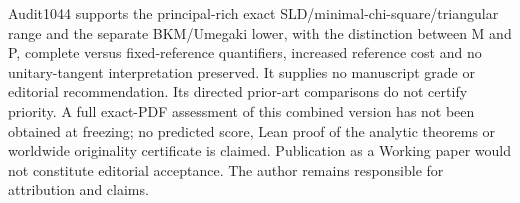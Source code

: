 Audit1044 supports the principal-rich exact SLD/minimal-chi-square/triangular range and the separate BKM/Umegaki lower, with the distinction between M and P, complete versus fixed-reference quantifiers, increased reference cost and no unitary-tangent interpretation preserved. It supplies no manuscript grade or editorial recommendation. Its directed prior-art comparisons do not certify priority. A full exact-PDF assessment of this combined version has not been obtained at freezing; no predicted score, Lean proof of the analytic theorems or worldwide originality certificate is claimed. Publication as a Working paper would not constitute editorial acceptance. The author remains responsible for attribution and claims.
